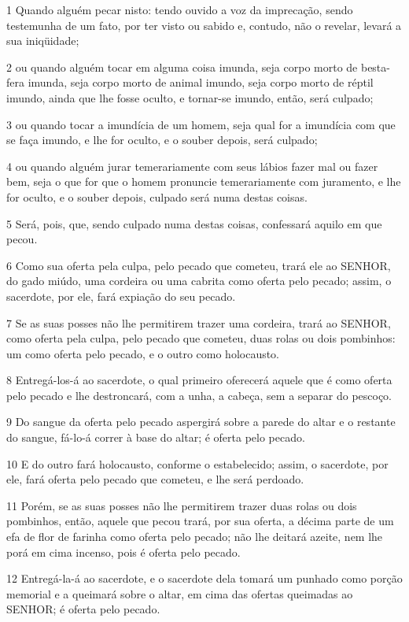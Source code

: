 \par 1 Quando alguém pecar nisto: tendo ouvido a voz da imprecação, sendo testemunha de um fato, por ter visto ou sabido e, contudo, não o revelar, levará a sua iniqüidade;
\par 2 ou quando alguém tocar em alguma coisa imunda, seja corpo morto de besta-fera imunda, seja corpo morto de animal imundo, seja corpo morto de réptil imundo, ainda que lhe fosse oculto, e tornar-se imundo, então, será culpado;
\par 3 ou quando tocar a imundícia de um homem, seja qual for a imundícia com que se faça imundo, e lhe for oculto, e o souber depois, será culpado;
\par 4 ou quando alguém jurar temerariamente com seus lábios fazer mal ou fazer bem, seja o que for que o homem pronuncie temerariamente com juramento, e lhe for oculto, e o souber depois, culpado será numa destas coisas.
\par 5 Será, pois, que, sendo culpado numa destas coisas, confessará aquilo em que pecou.
\par 6 Como sua oferta pela culpa, pelo pecado que cometeu, trará ele ao SENHOR, do gado miúdo, uma cordeira ou uma cabrita como oferta pelo pecado; assim, o sacerdote, por ele, fará expiação do seu pecado.
\par 7 Se as suas posses não lhe permitirem trazer uma cordeira, trará ao SENHOR, como oferta pela culpa, pelo pecado que cometeu, duas rolas ou dois pombinhos: um como oferta pelo pecado, e o outro como holocausto.
\par 8 Entregá-los-á ao sacerdote, o qual primeiro oferecerá aquele que é como oferta pelo pecado e lhe destroncará, com a unha, a cabeça, sem a separar do pescoço.
\par 9 Do sangue da oferta pelo pecado aspergirá sobre a parede do altar e o restante do sangue, fá-lo-á correr à base do altar; é oferta pelo pecado.
\par 10 E do outro fará holocausto, conforme o estabelecido; assim, o sacerdote, por ele, fará oferta pelo pecado que cometeu, e lhe será perdoado.
\par 11 Porém, se as suas posses não lhe permitirem trazer duas rolas ou dois pombinhos, então, aquele que pecou trará, por sua oferta, a décima parte de um efa de flor de farinha como oferta pelo pecado; não lhe deitará azeite, nem lhe porá em cima incenso, pois é oferta pelo pecado.
\par 12 Entregá-la-á ao sacerdote, e o sacerdote dela tomará um punhado como porção memorial e a queimará sobre o altar, em cima das ofertas queimadas ao SENHOR; é oferta pelo pecado.
